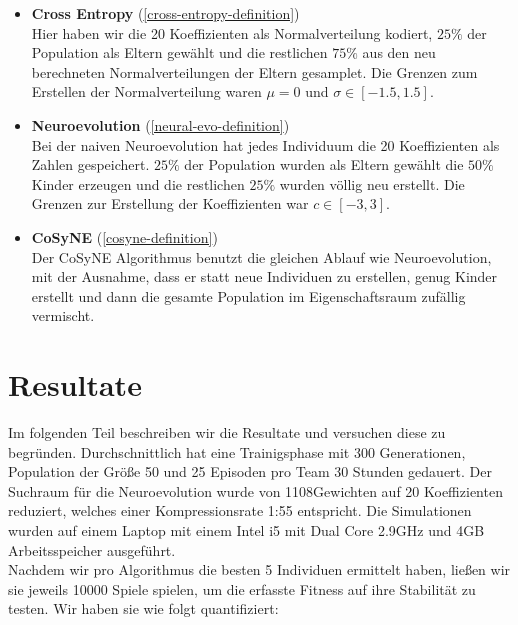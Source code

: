        \begin{itemize}
            \setlength\itemsep{1em}
            \item \textbf{Cross Entropy} (\ref{cross-entropy-definition}) \\
            Hier haben wir die 20 Koeffizienten als Normalverteilung kodiert, $25\%$ der Population als Eltern gewählt und die restlichen $75\%$ aus den neu berechneten Normalverteilungen der Eltern gesamplet. Die Grenzen zum Erstellen der Normalverteilung waren $\mu = 0$ und $\sigma \in [-1.5,1.5]$.

            \item \textbf{Neuroevolution} (\ref{neural-evo-definition}) \\
            Bei der naiven Neuroevolution hat jedes Individuum die 20 Koeffizienten als Zahlen gespeichert. $25\%$ der Population wurden als Eltern gewählt die $50\%$ Kinder erzeugen und die restlichen $25\%$ wurden völlig neu erstellt. Die Grenzen zur Erstellung der Koeffizienten war $c \in [-3,3]$.

            \item \textbf{CoSyNE} (\ref{cosyne-definition}) \\
            Der CoSyNE Algorithmus benutzt die gleichen Ablauf wie Neuroevolution, mit der Ausnahme, dass er statt neue Individuen zu erstellen, genug Kinder erstellt und dann die gesamte Population im Eigenschaftsraum zufällig vermischt.

        \end{itemize}

\newpage

\chapter{Resultate}
    Im folgenden Teil beschreiben wir die Resultate und versuchen diese zu begründen. Durchschnittlich hat eine Trainigsphase mit 300 Generationen, Population der Größe 50 und 25 Episoden pro Team 30 Stunden gedauert. Der Suchraum für die Neuroevolution wurde von 1108Gewichten auf 20 Koeffizienten reduziert, welches einer Kompressionsrate 1:55 entspricht. Die Simulationen wurden auf einem Laptop mit einem Intel i5 mit Dual Core 2.9GHz und 4GB Arbeitsspeicher ausgeführt.\\[2mm]
    \noindent
    Nachdem wir pro Algorithmus die besten 5 Individuen ermittelt haben, ließen wir sie jeweils 10000 Spiele spielen, um die erfasste Fitness auf ihre Stabilität zu testen. Wir haben sie wie folgt quantifiziert:\\[2mm]

